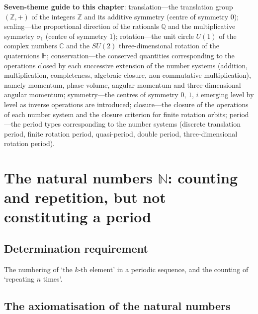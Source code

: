 \begin{remark}
\textbf{Seven-theme guide to this chapter}: translation---the translation group $(\mathbb{Z},+)$ of the integers $\mathbb{Z}$ and its additive symmetry (centre of symmetry $0$); scaling---the proportional direction of the rationals $\mathbb{Q}$ and the multiplicative symmetry $\sigma_1$ (centre of symmetry $1$); rotation---the unit circle $U(1)$ of the complex numbers $\mathbb{C}$ and the $SU(2)$ three-dimensional rotation of the quaternions $\mathbb{H}$; conservation---the conserved quantities corresponding to the operations closed by each successive extension of the number systems (addition, multiplication, completeness, algebraic closure, non-commutative multiplication), namely momentum, phase volume, angular momentum and three-dimensional angular momentum; symmetry---the centres of symmetry $0$, $1$, $i$ emerging level by level as inverse operations are introduced; closure---the closure of the operations of each number system and the closure criterion for finite rotation orbits; period---the period types corresponding to the number systems (discrete translation period, finite rotation period, quasi-period, double period, three-dimensional rotation period).
\end{remark}

\section{\texorpdfstring{The natural numbers $\mathbb{N}$: counting and repetition, but not constituting a period}{The natural numbers N: counting and repetition, but not constituting a period}}

\subsection{\texorpdfstring{Determination requirement}{Determination requirement}}

The numbering of `the $k$-th element' in a periodic sequence, and the counting of `repeating $n$ times'.

\subsection{\texorpdfstring{The axiomatisation of the natural numbers}{The axiomatisation of the natural numbers}}

